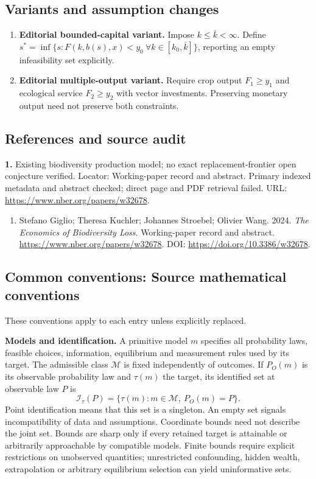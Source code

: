 \documentclass[11pt,a4paper]{article}
\begin{document}
\subsection*{Variants and assumption changes}
\begin{enumerate}
\item \textbf{Editorial bounded-capital variant.} Impose \(k\leq\bar k<\infty\). Define \(s^*=\inf\{s:F(k,b(s),x)<y_0\ \forall k\in[k_0,\bar k]\}\), reporting an empty infeasibility set explicitly.
\item \textbf{Editorial multiple-output variant.} Require crop output \(F_1\geq y_1\) and ecological service \(F_2\geq y_2\) with vector investments. Preserving monetary output need not preserve both constraints.
\end{enumerate}
\subsection*{References and source audit}
\textbf{1.} Existing biodiversity production model; no exact replacement-frontier open conjecture verified. Locator: Working-paper record and abstract. Primary indexed metadata and abstract checked; direct page and PDF retrieval failed. URL: \url{https://www.nber.org/papers/w32678}.
\begin{enumerate}\raggedright
\item\hypertarget{definitions:source:30007718:1}{} Stefano Giglio; Theresa Kuchler; Johannes Stroebel; Olivier Wang. 2024. \emph{The Economics of Biodiversity Loss}. Working-paper record and abstract.
\url{https://www.nber.org/papers/w32678}.
DOI: \url{https://doi.org/10.3386/w32678}.
\end{enumerate}

\subsection*{Common conventions: Source mathematical conventions}

These conventions apply to each entry unless explicitly replaced.

\textbf{Models and identification.} A primitive model \(m\) specifies all probability laws, feasible choices, information, equilibrium and measurement rules used by its target. The admissible class \(\mathcal M\) is fixed independently of outcomes. If \(P_O(m)\) is its observable probability law and \(\tau(m)\) the target, its identified set at observable law \(P\) is
\[
 \mathcal I_\tau(P)=\{\tau(m):m\in\mathcal M,\ P_O(m)=P\}.
\]
Point identification means that this set is a singleton. An empty set signals incompatibility of data and assumptions. Coordinate bounds need not describe the joint set. Bounds are sharp only if every retained target is attainable or arbitrarily approachable by compatible models. Finite bounds require explicit restrictions on unobserved quantities; unrestricted confounding, hidden wealth, extrapolation or arbitrary equilibrium selection can yield uninformative sets.
\end{document}
